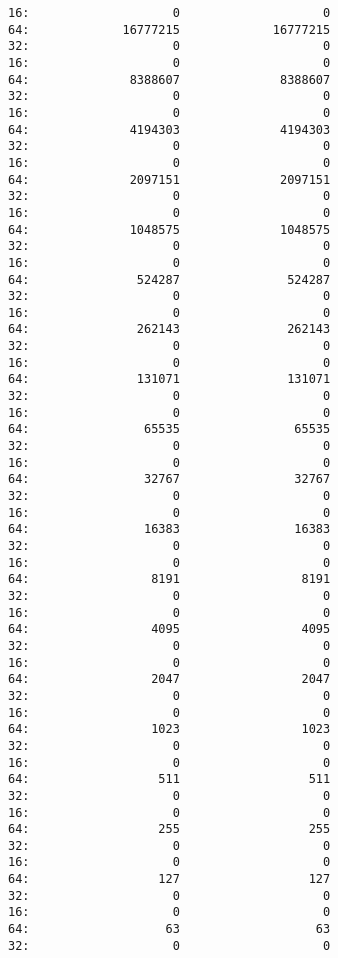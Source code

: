 \documentclass[11pt]{article}
\begin{document}
\begin{verbatim}
16:                    0                    0
64:             16777215             16777215
32:                    0                    0
16:                    0                    0
64:              8388607              8388607
32:                    0                    0
16:                    0                    0
64:              4194303              4194303
32:                    0                    0
16:                    0                    0
64:              2097151              2097151
32:                    0                    0
16:                    0                    0
64:              1048575              1048575
32:                    0                    0
16:                    0                    0
64:               524287               524287
32:                    0                    0
16:                    0                    0
64:               262143               262143
32:                    0                    0
16:                    0                    0
64:               131071               131071
32:                    0                    0
16:                    0                    0
64:                65535                65535
32:                    0                    0
16:                    0                    0
64:                32767                32767
32:                    0                    0
16:                    0                    0
64:                16383                16383
32:                    0                    0
16:                    0                    0
64:                 8191                 8191
32:                    0                    0
16:                    0                    0
64:                 4095                 4095
32:                    0                    0
16:                    0                    0
64:                 2047                 2047
32:                    0                    0
16:                    0                    0
64:                 1023                 1023
32:                    0                    0
16:                    0                    0
64:                  511                  511
32:                    0                    0
16:                    0                    0
64:                  255                  255
32:                    0                    0
16:                    0                    0
64:                  127                  127
32:                    0                    0
16:                    0                    0
64:                   63                   63
32:                    0                    0

\end{verbatim}
\end{document}
